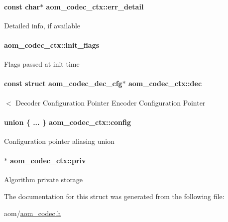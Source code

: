 \paragraph[{\texorpdfstring{err\+\_\+detail}{err_detail}}]{\setlength{\rightskip}{0pt plus 5cm}const char$\ast$ aom\+\_\+codec\+\_\+ctx\+::err\+\_\+detail}\hypertarget{structaom__codec__ctx_ad152db82a10b68df869ccb29370dae00}{}\label{structaom__codec__ctx_ad152db82a10b68df869ccb29370dae00}
Detailed info, if available 
\paragraph[{\texorpdfstring{init\+\_\+flags}{init_flags}}]{ aom\+\_\+codec\+\_\+ctx\+::init\+\_\+flags}\hypertarget{structaom__codec__ctx_acb3a6528de757c4c862fa77619ef7e40}{}\label{structaom__codec__ctx_acb3a6528de757c4c862fa77619ef7e40}
Flags passed at init time 
\paragraph[{\texorpdfstring{dec}{dec}}]{\setlength{\rightskip}{0pt plus 5cm}const struct {\bf aom\+\_\+codec\+\_\+dec\+\_\+cfg}$\ast$ aom\+\_\+codec\+\_\+ctx\+::dec}\hypertarget{structaom__codec__ctx_a4b762ba3bde6bc72fddc9543adca33ef}{}\label{structaom__codec__ctx_a4b762ba3bde6bc72fddc9543adca33ef}
$<$ Decoder Configuration Pointer Encoder Configuration Pointer 
\paragraph[{\texorpdfstring{config}{config}}]{\setlength{\rightskip}{0pt plus 5cm}union \{ ... \}   aom\+\_\+codec\+\_\+ctx\+::config}\hypertarget{structaom__codec__ctx_ac6777025d3b72c9ab49adba78fc70b30}{}\label{structaom__codec__ctx_ac6777025d3b72c9ab49adba78fc70b30}
Configuration pointer aliasing union 
\paragraph[{\texorpdfstring{priv}{priv}}]{$\ast$ aom\+\_\+codec\+\_\+ctx\+::priv}\hypertarget{structaom__codec__ctx_a9bd533e9da28ce73c8b787d4359ed337}{}\label{structaom__codec__ctx_a9bd533e9da28ce73c8b787d4359ed337}
Algorithm private storage 

The documentation for this struct was generated from the following file\+:\begin{DoxyCompactItemize}
\item 
aom/\hyperlink{aom__codec_8h}{aom\+\_\+codec.\+h}\end{DoxyCompactItemize}
